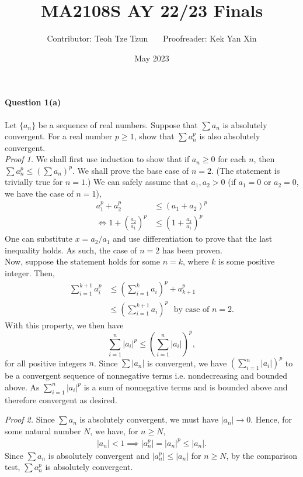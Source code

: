 \documentclass{article}
\title{MA2108S AY 22/23 Finals}
\author{Contributor: Teoh Tze Tzun \ \ \ Proofreader: Kek Yan Xin}
\date{May 2023}
\begin{document}
\maketitle 

\paragraph{Question 1(a)} Let $\{a_n\}$ be a sequence of real numbers. Suppose that $\sum a_n$ is absolutely convergent. For a real number $p \geq 1$, show that $\sum a_n^p$ is also absolutely convergent. \\
\textit{Proof 1.} We shall first use induction to show that if $a_n\geq0$ for each $n$, then $\sum a_n^p \leq \left(\sum a_n \right)^p$. We shall prove the base case of $n = 2$. (The statement is trivially true for $n=1$.) 
We can safely assume that $a_1, a_2 > 0$ (if $a_1 = 0$ or $a_2 = 0$, we have the case of $n=1$),
\begin{align*}
    a_1^p + a_2^p &\leq (a_1 + a_2)^p \\
   \iff 1 + \left(\frac{a_2}{a_1}\right)^p &\leq \left(1 + \frac{a_2}{a_1}\right)^p 
\end{align*}
One can substitute $x = a_2/a_1$ and use differentiation to prove that the last inequality holds. As such, the case of $n = 2$ has been proven. \\
Now, suppose the statement holds for some $n = k$, where $k$ is some positive integer. Then, 
\begin{align*}
    \sum_{i=1}^{k+1} a_i^p &\leq \left( \sum_{i=1}^k a_i \right)^p + a_{k+1}^p \\
    &\leq \left( \sum_{i=1}^{k+1} a_i \right)^p \ \ \ \text{by case of $n=2$}.
\end{align*}
With this property, we then have
$$ \sum_{i=1}^n |a_i|^p \leq \left( \sum_{i=1}^n |a_i| \right)^p, $$
for all positive integers $n$. Since $\sum |a_n|$ is convergent, we have $\left( \sum_{i=1}^n |a_i| \right)^p$ to be a convergent sequence of nonnegative terms i.e. nondecreasing and bounded above. As $\sum_{i=1}^n |a_i|^p$ is a sum of nonnegative terms and is bounded above and therefore convergent as desired. \bigskip

\noindent\textit{Proof 2.} Since $\sum a_n$ is absolutely convergent, we must have $|a_n|\to 0$. Hence, for some natural number $N$, we have, for $n\geq N$,
\begin{align*}
    |a_n| < 1\implies |a_n^p| = |a_n|^p \leq |a_n|.
\end{align*}
Since $\sum a_n$ is absolutely convergent and $|a_n^p|\leq|a_n|$ for $n\geq N$, by the comparison test, $\sum a_n^p$ is absolutely convergent.
\end{document}
